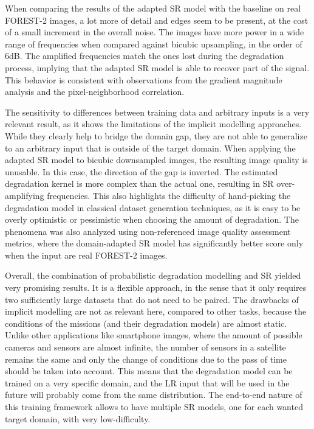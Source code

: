 When comparing the results of the adapted SR model with the baseline on real FOREST-2 images, a lot more of detail and edges seem to be present, at the cost of a small increment in the overall noise. The images have more power in a wide range of frequencies when compared against bicubic upsampling, in the order of 6dB. The amplified frequencies match the ones lost during the degradation process, implying that the adapted SR model is able to recover part of the signal.  This behavior is consistent with observations from the gradient magnitude analysis and the pixel-neighborhood correlation.

The sensitivity to differences between training data and arbitrary inputs is a very relevant result, as it shows the limitations of the implicit modelling approaches. While they clearly help to bridge the domain gap, they are not able to generalize to an arbitrary input that is outside of the target domain.
When applying the adapted SR model to bicubic downsampled images, the resulting image quality is unusable.
In this case, the direction of the gap is inverted. The estimated degradation kernel is more complex than the actual one, resulting in SR over-amplifying frequencies. This also highlights the difficulty of hand-picking the degradation model in classical dataset generation techniques, as it is easy to be overly optimistic or pessimistic when choosing the amount of degradation.
The phenomena was also analyzed using non-referenced image quality assessment metrics, where the domain-adapted SR model has significantly better score only when the input are real FOREST-2 images. 

Overall, the combination of probabilistic degradation modelling and SR yielded very promising results. It is a flexible approach, in the sense that it only requires two sufficiently large datasets that do not need to be paired. 
The drawbacks of implicit modelling are not as relevant here, compared to other tasks, because the conditions of the missions (and their degradation models) are almost static. Unlike other applications like smartphone images, where the amount of possible cameras and sensors are almost infinite, the number of sensors in a satellite remains the same and only the change of conditions due to the pass of time should be taken into account. This means that the degradation model can be trained on a very specific domain, and the LR input that will be used in the future will probably come from the same distribution. The end-to-end nature of this training framework allows to have multiple SR models, one for each wanted target domain, with very low-difficulty.

